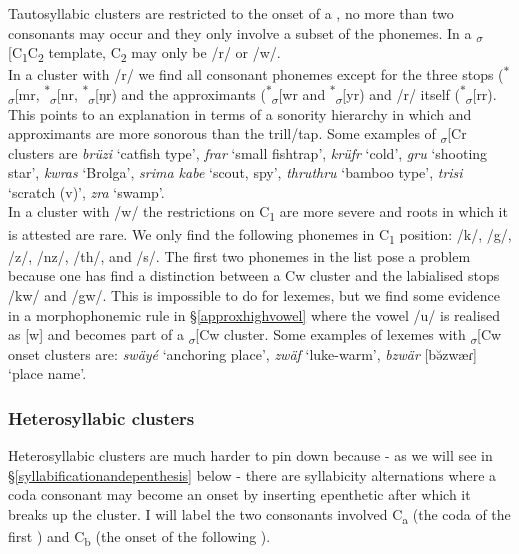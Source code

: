 Tautosyllabic clusters are restricted to the onset of a , no more than two consonants may occur and they only involve a subset of the phonemes. In a \textsubscript{$\sigma$}[C\textsubscript{1}C\textsubscript{2} template, C\textsubscript{2} may only be /r/ or /w/.\\

In a cluster with /r/ we find all consonant phonemes except for the three  stops (\textsuperscript{$\ast$}\textsubscript{$\sigma$}[mr, \textsuperscript{$\ast$}\textsubscript{$\sigma$}[nr, \textsuperscript{$\ast$}\textsubscript{$\sigma$}[ŋr) and the approximants (\textsuperscript{$\ast$}\textsubscript{$\sigma$}[wr and \textsuperscript{$\ast$}\textsubscript{$\sigma$}[yr) and /r/ itself (\textsuperscript{$\ast$}\textsubscript{$\sigma$}[rr). This points to an explanation in terms of a sonority hierarchy in which  and approximants are more sonorous than the trill/tap. Some examples of \textsubscript{$\sigma$}[Cr clusters are \emph{brüzi} `catfish type', \emph{frar} `small fishtrap', \emph{krüfr} `cold', \emph{gru} `shooting star', \emph{kwras} `Brolga', \emph{srima kabe} `scout, spy', \emph{thruthru} `bamboo type', \emph{trisi} `scratch (v)', \emph{zra} `swamp'.\\

In a cluster with /w/ the restrictions on C\textsubscript{1} are more severe and roots in which it is attested are rare. We only find the following phonemes in C\textsubscript{1} position: /k/, /g/, /z/, /nz/, /th/, and /s/. The first two phonemes in the list pose a problem because one has find a distinction between a Cw cluster and the labialised  stops /kw/ and /gw/. This is impossible to do for lexemes, but we find some evidence in a morphophonemic rule in \S{}\ref{approxhighvowel} where the vowel /u/ is realised as [w] and becomes part of a \textsubscript{$\sigma$}[Cw cluster. Some examples of lexemes with \textsubscript{$\sigma$}[Cw onset clusters are: \emph{swäyé} `anchoring place', \emph{zwäf} `luke-warm', \emph{bzwär} [bə̆zwæɾ] `place name'.

\subsubsection{Heterosyllabic clusters} \label{heterosyllabiccc}

Heterosyllabic clusters are much harder to pin down because - as we will see in \S{}\ref{syllabificationandepenthesis} below - there are syllabicity alternations where a coda consonant may become an onset by inserting epenthetic  after which it breaks up the cluster. I will label the two consonants involved C\textsubscript{a} (the coda of the first ) and C\textsubscript{b} (the onset of the following ).\\

